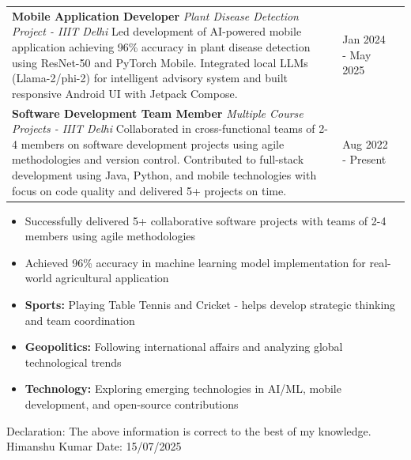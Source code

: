 \documentclass[10pt]{extarticle}
\begin{document}
\begin{contained}
\begin{longtable}{p{}p{}p{}}
    \textbf{Mobile Application Developer} \newline
    \textit{Plant Disease Detection Project - IIIT Delhi} \newline
    Led development of AI-powered mobile application achieving 96\% accuracy in plant disease detection using ResNet-50 and PyTorch Mobile. Integrated local LLMs (Llama-2/phi-2) for intelligent advisory system and built responsive Android UI with Jetpack Compose. &
    Jan 2024 - May 2025\\

    \textbf{Software Development Team Member} \newline
    \textit{Multiple Course Projects - IIIT Delhi} \newline
    Collaborated in cross-functional teams of 2-4 members on software development projects using agile methodologies and version control. Contributed to full-stack development using Java, Python, and mobile technologies with focus on code quality and delivered 5+ projects on time. &
    Aug 2022 - Present\\
\end{longtable}
\end{contained}


\begin{contained}
\begin{itemize}
    \item Successfully delivered 5+ collaborative software projects with teams of 2-4 members using agile methodologies
    \item Achieved 96\% accuracy in machine learning model implementation for real-world agricultural application
\end{itemize}
\end{contained}

\begin{contained}
\begin{itemize}
    \item \textbf{Sports:} Playing Table Tennis and Cricket - helps develop strategic thinking and team coordination
    \item \textbf{Geopolitics:} Following international affairs and analyzing global technological trends
    \item \textbf{Technology:} Exploring emerging technologies in AI/ML, mobile development, and open-source contributions
\end{itemize}
\end{contained}

\vspace{10pt}
Declaration: The above information is correct to the best of my knowledge.\newline
Himanshu Kumar\newline
Date: 15/07/2025
\end{document}
